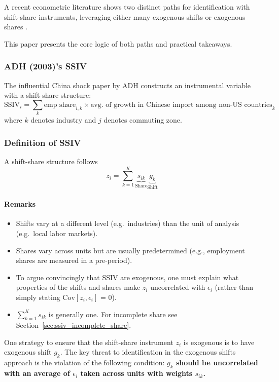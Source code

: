 A recent econometric literature shows two distinct paths for identification with shift-share instruments, 
leveraging either many exogenous shifts \citep{Borusyak:2022, Adao:2019} 
or exogenous shares \citep{Goldsmith-Pinkham:2020}. 

This paper presents the core logic of both paths and practical takeaways.


\subsubsection{ADH (2003)'s SSIV}
The influential China shock paper by ADH 
constructs an instrumental variable with a shift-share structure:
\begin{equation}
    \text{SSIV}_{i} = \sum_{k} \text{emp share}_{i,k} \times \text{avg. of growth in Chinese import among non-US countries}_{k}
\end{equation}
where $k$ denotes industry and $j$ denotes commuting zone.

\subsubsection{Definition of SSIV}
A shift-share structure follows
\begin{equation}
    z_i = \sum_{k=1}^K \underbrace{s_{ik}}_{\text{Share}} 
        \underbrace{g_k}_{\text{Shift}}
\end{equation}
\paragraph{Remarks}
\begin{itemize}
    \item Shifts vary at a different level (e.g.~industries) than the unit of analysis (e.g.~local labor markets).
    \item Shares vary across units but are usually predetermined (e.g., employment shares are measured in a pre-period).
    \item To argue convincingly that SSIV are exogenous, 
    one must explain what properties of the shifts and shares make $z_i$ uncorrelated with $\epsilon_i$ 
    (rather than simply stating $\text{Cov}[z_i, \epsilon_i]$ = 0).
    \item $\sum_{k=1}^K s_{ik}$ is generally one. For incomplete share see Section~\ref{sec:ssiv_incomplete_share}.
\end{itemize}

One strategy to ensure that the shift-share instrument $z_i$ is exogenous is to have exogenous shift $g_k$.
The key threat to identification in the exogenous shifts approach is the violation of the following condition:
\textbf{
    $g_k$ should be uncorrelated with an average of $\epsilon_i$ taken across units with weights $s_{ik}$.
}

